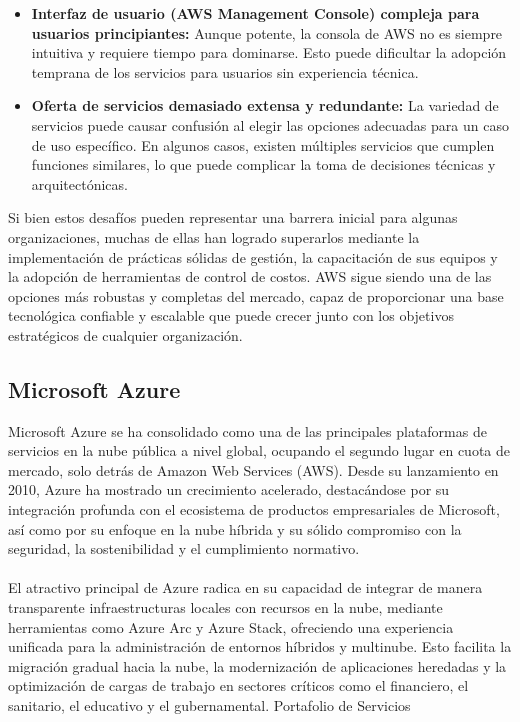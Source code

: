 {\begin{itemize}
                    \item \textbf{Interfaz de usuario (AWS Management Console) compleja para usuarios principiantes:} Aunque potente, la consola de AWS no es siempre intuitiva y requiere tiempo para dominarse. Esto puede dificultar la adopción temprana de los servicios para usuarios sin experiencia técnica.
                    \item \textbf{Oferta de servicios demasiado extensa y redundante:} La variedad de servicios puede causar confusión al elegir las opciones adecuadas para un caso de uso específico. En algunos casos, existen múltiples servicios que cumplen funciones similares, lo que puede complicar la toma de decisiones técnicas y arquitectónicas.
                \end{itemize}
                                
                Si bien estos desafíos pueden representar una barrera inicial para algunas organizaciones, muchas de ellas han logrado superarlos mediante la implementación de prácticas sólidas de gestión, la capacitación de sus equipos y la adopción de herramientas de control de costos. AWS sigue siendo una de las opciones más robustas y completas del mercado, capaz de proporcionar una base tecnológica confiable y escalable que puede crecer junto con los objetivos estratégicos de cualquier organización.
                
        \subsection{Microsoft Azure}
            Microsoft Azure se ha consolidado como una de las principales plataformas de servicios en la nube pública a nivel global, ocupando el segundo lugar en cuota de mercado, solo detrás de Amazon Web Services (AWS). Desde su lanzamiento en 2010, Azure ha mostrado un crecimiento acelerado, destacándose por su integración profunda con el ecosistema de productos empresariales de Microsoft, así como por su enfoque en la nube híbrida y su sólido compromiso con la seguridad, la sostenibilidad y el cumplimiento normativo.
            
            \paragraph{}El atractivo principal de Azure radica en su capacidad de integrar de manera transparente infraestructuras locales con recursos en la nube, mediante herramientas como Azure Arc y Azure Stack, ofreciendo una experiencia unificada para la administración de entornos híbridos y multinube. Esto facilita la migración gradual hacia la nube, la modernización de aplicaciones heredadas y la optimización de cargas de trabajo en sectores críticos como el financiero, el sanitario, el educativo y el gubernamental.
            Portafolio de Servicios
            
}

